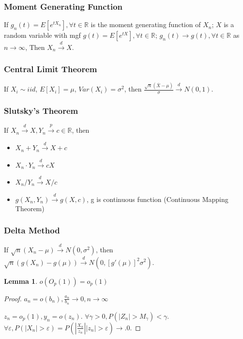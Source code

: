 \documentclass[11pt, a4paper, oneside]{article}
\theoremstyle{definition}
\theoremstyle{proposition}
\theoremstyle{corollary}
\newtheorem{myl}{Lemma}
\theoremstyle{lemma}
\theoremstyle{theorem}
\begin{document}
\subsubsection{Moment Generating Function}
If $g_n(t) = E[e^{tX_n}], \forall t \in \mathbb{R}$ is the moment generating function of $X_n$; $X$ is a random variable with mgf $g(t) = E[e^{tX}], \forall t \in \mathbb{R}$; $g_n(t)\to g(t), \forall t \in \mathbb{R}$ as $n \to \infty$, Then $X_n\overset{d}{\to} X$. 


\subsubsection{Central Limit Theorem}
If $X_i \sim iid$, $E[X_i] = \mu$, $Var(X_i) = \sigma^2$, then $\frac{\sqrt{n}(\bar{X} - \mu)}{\sigma} \overset{d}{\to} N(0, 1)$. 

\subsubsection{Slutsky's Theorem}
If $X_n \overset{d}{\to} X, Y_n \overset{p}{\to} c \in \mathbb{R}$, then
\begin{itemize}
\item $X_n + Y_n \overset{d}{\to} X + c$ 
\item $X_n \cdot Y_n \overset{d}{\to} cX$ 
\item $X_n/Y_n \overset{d}{\to} X/c$
\item $g(X_n, Y_n) \overset{d}{\to} g(X, c)$, g is continuous function (Continuous Mapping Theorem)
\end{itemize}

\subsubsection{Delta Method}
If $\sqrt{n}(X_n -\mu) \overset{d}{\to} N(0, \sigma^2)$, then $\sqrt{n}(g(X_n) - g(\mu)) \overset{d}{\to} N(0, [g'(\mu)]^2\sigma^2)$. 

\begin{myl}
$o(O_p(1)) = o_p(1)$
\end{myl}

\begin{proof}
$a_n = o(b_n ), \frac{a_n}{b_n} \to 0, n \to \infty$

$z_n = o_p(1), y_n = o(z_n)$. $\forall \gamma >0, P(|Z_n| > M_{\gamma}) < \gamma$. $\forall \varepsilon, P(|X_n|>\varepsilon) = P(|\frac{X_n}{z_n}||z_n| > \varepsilon) \to. 0$. 
\end{proof}
\end{document}
